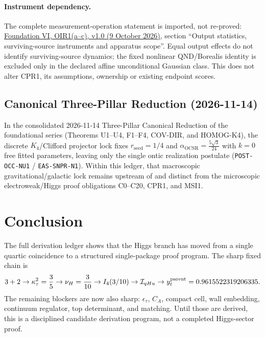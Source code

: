 \documentclass[11pt]{article}
\begin{document}
\paragraph{Instrument dependency.}
The complete measurement-operation statement is imported, not re-proved:
\href{https://github.com/tau-core-research/tau-core-quantum-readout-foundation-paper-vi/blob/main/paperVI_submission_source/main.pdf#nameddest=oir1}{Foundation VI, OIR1(a--c), v1.0 (9 October 2026)},
section ``Output statistics, surviving-source instruments and apparatus
scope''. Equal output effects do not identify surviving-source dynamics;
the fixed nonlinear QND/Borealis identity is excluded only in the declared
affine unconditional Gaussian class. This does not alter CPR1, its
assumptions, ownership or existing endpoint scores.

\subsection{Canonical Three-Pillar Reduction (2026-11-14)}
In the consolidated 2026-11-14 Three-Pillar Canonical Reduction of the foundational series (Theorems U1--U4, F1--F4, COV-DIR, and HOMOG-K4), the discrete $K_4$/Clifford projector lock fixes $r_{\mathrm{seed}}=1/4$ and $\alpha_{\mathrm{OCSR}}=\frac{5\sqrt{3}}{24}$ with $k=0$ free fitted parameters, leaving only the single ontic realization postulate (\texttt{POST-OCC-NU1} / \texttt{EAS-SNPR-N1}). Within this ledger, that macroscopic gravitational/galactic lock remains upstream of and distinct from the microscopic electroweak/Higgs proof obligations C0--C20, CPR1, and MSI1.

\section{Conclusion}
The full derivation ledger shows that the Higgs branch has moved from a single
quartic coincidence to a structured single-package proof program.  The sharp
fixed chain is
\begin{equation}
3+2
\rightarrow
\kappa_\tau^2=\frac35
\rightarrow
\nu_H=\frac3{10}
\rightarrow
I_4(3/10)
\rightarrow
{\cal I}_{qHu}
\rightarrow
 y_t^{\rm parent}=0.9615522319206335.
\end{equation}
The remaining blockers are now also sharp: $\epsilon_\tau$, $C_A$, compact cell,
wall embedding, continuum regulator, top determinant, and matching.  Until
those are derived, this is a disciplined candidate derivation program, not a
completed Higgs-sector proof.
\end{document}
